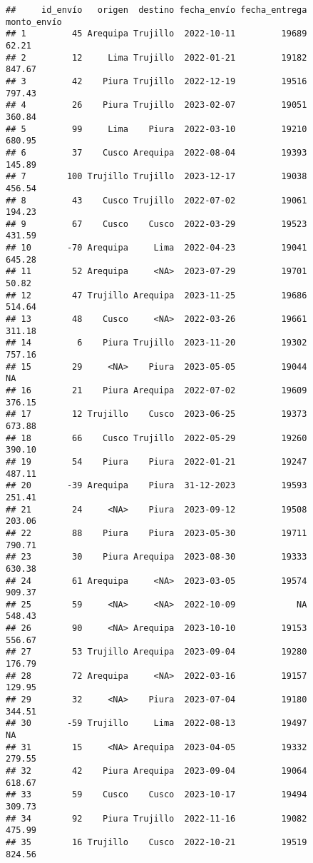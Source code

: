 \documentclass[
]{article}
\begin{document}
\begin{verbatim}
##     id_envío   origen  destino fecha_envío fecha_entrega monto_envío
## 1         45 Arequipa Trujillo  2022-10-11         19689       62.21
## 2         12     Lima Trujillo  2022-01-21         19182      847.67
## 3         42    Piura Trujillo  2022-12-19         19516      797.43
## 4         26    Piura Trujillo  2023-02-07         19051      360.84
## 5         99     Lima    Piura  2022-03-10         19210      680.95
## 6         37    Cusco Arequipa  2022-08-04         19393      145.89
## 7        100 Trujillo Trujillo  2023-12-17         19038      456.54
## 8         43    Cusco Trujillo  2022-07-02         19061      194.23
## 9         67    Cusco    Cusco  2022-03-29         19523      431.59
## 10       -70 Arequipa     Lima  2022-04-23         19041      645.28
## 11        52 Arequipa     <NA>  2023-07-29         19701       50.82
## 12        47 Trujillo Arequipa  2023-11-25         19686      514.64
## 13        48    Cusco     <NA>  2022-03-26         19661      311.18
## 14         6    Piura Trujillo  2023-11-20         19302      757.16
## 15        29     <NA>    Piura  2023-05-05         19044          NA
## 16        21    Piura Arequipa  2022-07-02         19609      376.15
## 17        12 Trujillo    Cusco  2023-06-25         19373      673.88
## 18        66    Cusco Trujillo  2022-05-29         19260      390.10
## 19        54    Piura    Piura  2022-01-21         19247      487.11
## 20       -39 Arequipa    Piura  31-12-2023         19593      251.41
## 21        24     <NA>    Piura  2023-09-12         19508      203.06
## 22        88    Piura    Piura  2023-05-30         19711      790.71
## 23        30    Piura Arequipa  2023-08-30         19333      630.38
## 24        61 Arequipa     <NA>  2023-03-05         19574      909.37
## 25        59     <NA>     <NA>  2022-10-09            NA      548.43
## 26        90     <NA> Arequipa  2023-10-10         19153      556.67
## 27        53 Trujillo Arequipa  2023-09-04         19280      176.79
## 28        72 Arequipa     <NA>  2022-03-16         19157      129.95
## 29        32     <NA>    Piura  2023-07-04         19180      344.51
## 30       -59 Trujillo     Lima  2022-08-13         19497          NA
## 31        15     <NA> Arequipa  2023-04-05         19332      279.55
## 32        42    Piura Arequipa  2023-09-04         19064      618.67
## 33        59    Cusco    Cusco  2023-10-17         19494      309.73
## 34        92    Piura Trujillo  2022-11-16         19082      475.99
## 35        16 Trujillo    Cusco  2022-10-21         19519      824.56

\end{verbatim}
\end{document}
